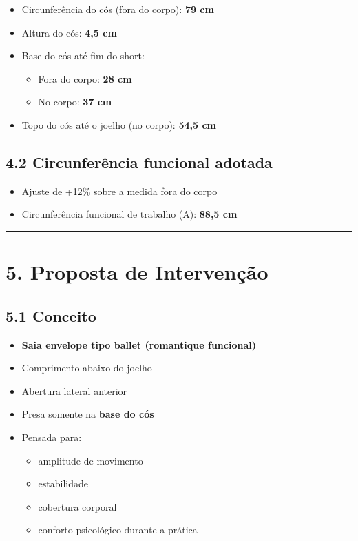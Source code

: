 \documentclass[
  10pt,oneside]{article}
\providecommand{\tightlist}{%
  \setlength{\itemsep}{0pt}\setlength{\parskip}{0pt}}
\begin{document}
\begin{itemize}
\tightlist
\item
  Circunferência do cós (fora do corpo): \textbf{79 cm}
\item
  Altura do cós: \textbf{4,5 cm}
\item
  Base do cós até fim do short:

  \begin{itemize}
  \tightlist
  \item
    Fora do corpo: \textbf{28 cm}
  \item
    No corpo: \textbf{37 cm}
  \end{itemize}
\item
  Topo do cós até o joelho (no corpo): \textbf{54,5 cm}
\end{itemize}

\subsection{4.2 Circunferência funcional adotada}\label{circunferuxeancia-funcional-adotada}

\begin{itemize}
\tightlist
\item
  Ajuste de +12\% sobre a medida fora do corpo
\item
  Circunferência funcional de trabalho (A): \textbf{88,5 cm}
\end{itemize}

\begin{center}\rule{0.5\linewidth}{0.5pt}\end{center}

\section{5. Proposta de Intervenção}\label{proposta-de-intervenuxe7uxe3o}

\subsection{5.1 Conceito}\label{conceito}

\begin{itemize}
\tightlist
\item
  \textbf{Saia envelope tipo ballet (romantique funcional)}
\item
  Comprimento abaixo do joelho
\item
  Abertura lateral anterior
\item
  Presa somente na \textbf{base do cós}
\item
  Pensada para:

  \begin{itemize}
  \tightlist
  \item
    amplitude de movimento
  \item
    estabilidade
  \item
    cobertura corporal
  \item
    conforto psicológico durante a prática
  \end{itemize}
\end{itemize}
\end{document}
